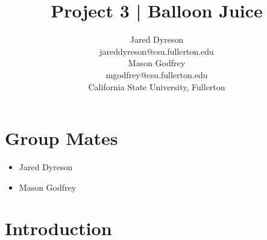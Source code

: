 \documentclass{article}
\title{Project 3 | Balloon Juice}
\author{Jared Dyreson \\
        jareddyreson@csu.fullerton.edu \\
        Mason Godfrey \\
        mgodfrey@csu.fullerton.edu \\
        California State University, Fullerton}
\date
\begin{document}
\maketitle
\tableofcontents

\newpage

\section{Group Mates}

\begin{itemize}
\item Jared Dyreson
\item Mason Godfrey
\end{itemize}

\section{Introduction}
\end{document}
